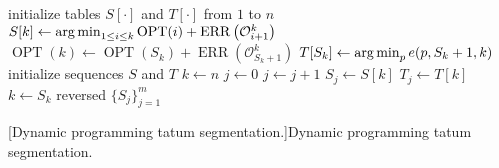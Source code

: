\begin{algorithm}[ht!]
    \begin{algorithmic}[1]
        \State initialize tables $S[\cdot]$ and $T[\cdot]$ from $1$ to $n$
            \State $S[k]\gets \argmin_{1\leq i \leq k}\operatorname{OPT}(i)+\operatorname{ERR}\left(\mathcal{O}_{i+1}^k\right)$
            \State $\operatorname{OPT}(k)\gets \operatorname{OPT}(S_k)+\operatorname{ERR}\left(\mathcal{O}_{S_k+1}^k\right)$
            \State $T[S_k]\gets\argmin_p e(p,S_k+1,k)$
        \EndFor
        \State initialize sequences $S$ and $T$
        \State $k \gets n$
        \State $j \gets 0$
            \State $j \gets j + 1$
            \State $S_j \gets S[k]$
            \State $T_j \gets T[k]$
            \State $k \gets S_k$ 
        \EndWhile
        \State \Return reversed $\{S_j\}_{j=1}^m$
    \end{algorithmic}
    [Dynamic programming tatum segmentation.]{Dynamic programming tatum segmentation.}
\end{algorithm}
